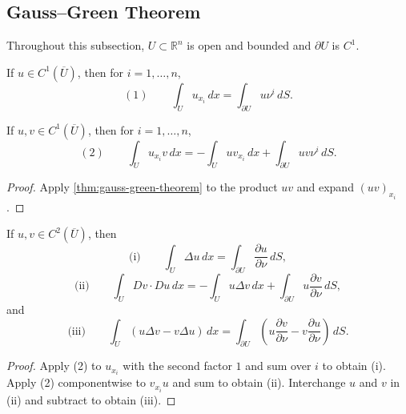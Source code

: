 \subsection{Gauss--Green Theorem}

Throughout this subsection, $U\subset\mathbb R^n$ is open and bounded and $\partial U$ is $C^1$.

\begin{theorem}
\label{thm:gauss-green-theorem}

If $u\in C^1(\overline U)$, then for $i=1,\ldots,n$,
\[
(1)\qquad
\int_Uu_{x_i}\,dx
=\int_{\partial U}u\nu^i\,dS.
\]
\end{theorem}

\begin{theorem}
\label{thm:integration-by-parts-formula}

If $u,v\in C^1(\overline U)$, then for $i=1,\ldots,n$,
\[
(2)\qquad
\int_Uu_{x_i}v\,dx
=-\int_Uuv_{x_i}\,dx
+\int_{\partial U}uv\nu^i\,dS.
\]
\end{theorem}
\begin{proof}
\sketch Apply \cref{thm:gauss-green-theorem} to the product $uv$ and expand $(uv)_{x_i}$.
\end{proof}

\begin{theorem}
\label{thm:greens-formulas}

If $u,v\in C^2(\overline U)$, then
\[
\text{(i)}\qquad
\int_U\Delta u\,dx
=\int_{\partial U}\frac{\partial u}{\partial\nu}\,dS,
\]
\[
\text{(ii)}\qquad
\int_UDv\cdot Du\,dx
=-\int_Uu\Delta v\,dx
+\int_{\partial U}u\frac{\partial v}{\partial\nu}\,dS,
\]
and
\[
\text{(iii)}\qquad
\int_U(u\Delta v-v\Delta u)\,dx
=\int_{\partial U}
\left(u\frac{\partial v}{\partial\nu}
-v\frac{\partial u}{\partial\nu}\right)\,dS.
\]
\end{theorem}
\begin{proof}
\sketch Apply (2) to $u_{x_i}$ with the second factor $1$ and sum over $i$ to obtain (i). Apply (2) componentwise to $v_{x_i}u$ and sum to obtain (ii). Interchange $u$ and $v$ in (ii) and subtract to obtain (iii).
\end{proof}

